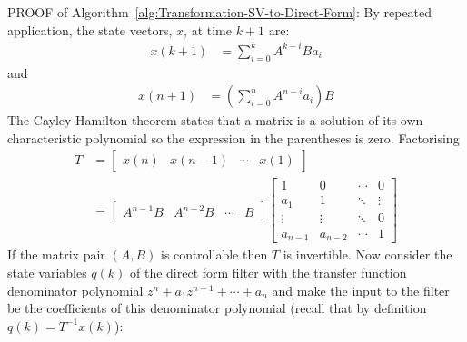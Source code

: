 \documentclass[a4paper,twoside,10pt,english]{report}
\begin{document}
\textsc{PROOF} of Algorithm~\ref{alg:Transformation-SV-to-Direct-Form}: 
By repeated application, the state vectors, $x$, at time $k+1$ are:
\begin{align*}
x\left(k+1\right) &= \sum_{i=0}^{k}A^{k-i}Ba_{i}
\end{align*}
and
\begin{align*}
x\left(n+1\right) &= \left(\sum_{i=0}^{n}A^{n-i}a_{i}\right)B
\end{align*}
The Cayley-Hamilton theorem states that a matrix is a solution of
its own characteristic polynomial so the expression in the parentheses
is zero. Factorising
\begin{align*}
T &= \left[\begin{array}{cccc}
x\left(n\right) & x\left(n-1\right) & \cdots & x\left(1\right)\end{array}\right]\\
 &= \left[\begin{array}{cccc}
A^{n-1}B & A^{n-2}B & \cdots & B\end{array}\right]\left[\begin{array}{cccc}
1 & 0 & \cdots & 0\\
a_{1} & 1 & \ddots & \vdots\\
\vdots & \vdots & \ddots & 0\\
a_{n-1} & a_{n-2} & \cdots & 1
\end{array}\right]
\end{align*}
If the matrix pair $\left(A,B\right)$ is controllable then $T$ is
invertible. Now consider the state variables $q\left(k\right)$ of
the direct form filter with the transfer function denominator polynomial
$z^{n}+a_{1}z^{n-1}+\cdots+a_{n}$ and make the input to the filter be
the coefficients of this denominator polynomial (recall that by definition
$q\left(k\right)=T^{-1}x\left(k\right)$):
\end{document}
